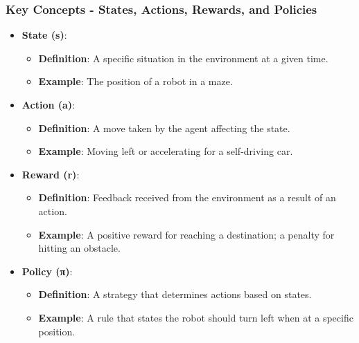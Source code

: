 \documentclass{beamer}
\begin{document}
\begin{frame}[fragile]
    \frametitle{Key Concepts - States, Actions, Rewards, and Policies}

    \begin{itemize}
        \item \textbf{State (s)}:
            \begin{itemize}
                \item \textbf{Definition}: A specific situation in the environment at a given time.
                \item \textbf{Example}: The position of a robot in a maze.
            \end{itemize}
        \item \textbf{Action (a)}:
            \begin{itemize}
                \item \textbf{Definition}: A move taken by the agent affecting the state.
                \item \textbf{Example}: Moving left or accelerating for a self-driving car.
            \end{itemize}
        \item \textbf{Reward (r)}:
            \begin{itemize}
                \item \textbf{Definition}: Feedback received from the environment as a result of an action.
                \item \textbf{Example}: A positive reward for reaching a destination; a penalty for hitting an obstacle.
            \end{itemize}
        \item \textbf{Policy (π)}:
            \begin{itemize}
                \item \textbf{Definition}: A strategy that determines actions based on states.
                \item \textbf{Example}: A rule that states the robot should turn left when at a specific position.
            \end{itemize}
    \end{itemize}
\end{frame}
\end{document}
